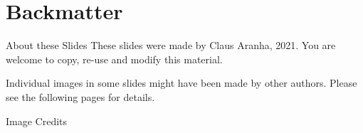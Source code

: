 \section{Backmatter}
\begin{frame}{About these Slides}
  These slides were made by Claus Aranha, 2021. You are welcome to copy, re-use and modify this material.
  \bigskip

  Individual images in some slides might have been made by other
  authors. Please see the following pages for details.
\end{frame}

\begin{frame}[allowframebreaks]{Image Credits}
  \printnotes
\end{frame}
